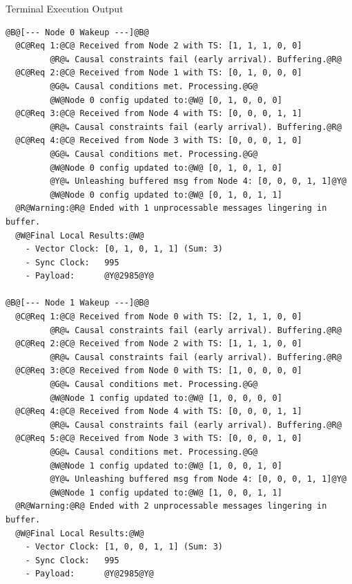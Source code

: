 \documentclass[11pt]{article}
\begin{document}
\begin{terminalbox}{Terminal Execution Output}
\begin{lstlisting}[style=terminalstyle]
@B@[--- Node 0 Wakeup ---]@B@
  @C@Req 1:@C@ Received from Node 2 with TS: [1, 1, 1, 0, 0]
         @R@↳ Causal constraints fail (early arrival). Buffering.@R@
  @C@Req 2:@C@ Received from Node 1 with TS: [0, 1, 0, 0, 0]
         @G@↳ Causal conditions met. Processing.@G@
         @W@Node 0 config updated to:@W@ [0, 1, 0, 0, 0]
  @C@Req 3:@C@ Received from Node 4 with TS: [0, 0, 0, 1, 1]
         @R@↳ Causal constraints fail (early arrival). Buffering.@R@
  @C@Req 4:@C@ Received from Node 3 with TS: [0, 0, 0, 1, 0]
         @G@↳ Causal conditions met. Processing.@G@
         @W@Node 0 config updated to:@W@ [0, 1, 0, 1, 0]
         @Y@↳ Unleashing buffered msg from Node 4: [0, 0, 0, 1, 1]@Y@
         @W@Node 0 config updated to:@W@ [0, 1, 0, 1, 1]
  @R@Warning:@R@ Ended with 1 unprocessable messages lingering in buffer.
  @W@Final Local Results:@W@
    - Vector Clock: [0, 1, 0, 1, 1] (Sum: 3)
    - Sync Clock:   995
    - Payload:      @Y@2985@Y@

@B@[--- Node 1 Wakeup ---]@B@
  @C@Req 1:@C@ Received from Node 0 with TS: [2, 1, 1, 0, 0]
         @R@↳ Causal constraints fail (early arrival). Buffering.@R@
  @C@Req 2:@C@ Received from Node 2 with TS: [1, 1, 1, 0, 0]
         @R@↳ Causal constraints fail (early arrival). Buffering.@R@
  @C@Req 3:@C@ Received from Node 0 with TS: [1, 0, 0, 0, 0]
         @G@↳ Causal conditions met. Processing.@G@
         @W@Node 1 config updated to:@W@ [1, 0, 0, 0, 0]
  @C@Req 4:@C@ Received from Node 4 with TS: [0, 0, 0, 1, 1]
         @R@↳ Causal constraints fail (early arrival). Buffering.@R@
  @C@Req 5:@C@ Received from Node 3 with TS: [0, 0, 0, 1, 0]
         @G@↳ Causal conditions met. Processing.@G@
         @W@Node 1 config updated to:@W@ [1, 0, 0, 1, 0]
         @Y@↳ Unleashing buffered msg from Node 4: [0, 0, 0, 1, 1]@Y@
         @W@Node 1 config updated to:@W@ [1, 0, 0, 1, 1]
  @R@Warning:@R@ Ended with 2 unprocessable messages lingering in buffer.
  @W@Final Local Results:@W@
    - Vector Clock: [1, 0, 0, 1, 1] (Sum: 3)
    - Sync Clock:   995
    - Payload:      @Y@2985@Y@


\end{lstlisting}
\end{terminalbox}
\end{document}
